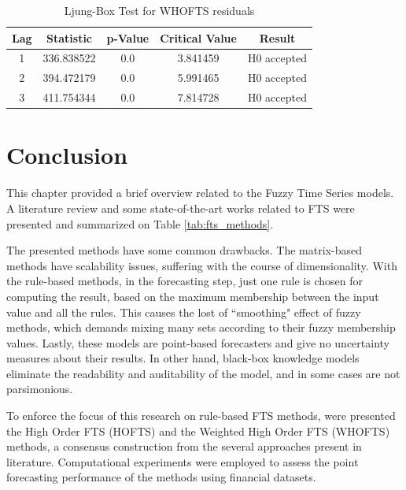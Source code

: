\begin{table}[htb]
    \centering
    \begin{tabular}{|c|c|c|c|c|}
\hline
Lag &   Statistic &  p-Value &  Critical Value &       Result \\ \hline
1 &  336.838522 &      0.0 &        3.841459 &  H0 accepted \\ \hline
2 &  394.472179 &      0.0 &        5.991465 &  H0 accepted \\ \hline
3 &  411.754344 &      0.0 &        7.814728 &  H0 accepted \\ \hline
\end{tabular}
    \caption{Ljung-Box Test for WHOFTS residuals}
    \label{tab:whofts_residuals}
\end{table}

\section{Conclusion} 

This chapter provided a brief overview related to the Fuzzy Time Series models. A literature review and some state-of-the-art works related to FTS were presented and summarized on Table \ref{tab:fts_methods}.

The presented methods have some common drawbacks. The matrix-based methods have scalability issues, suffering with the course of dimensionality. With the rule-based methods, in the forecasting step, just one rule is chosen for computing the result, based on the maximum membership between the input value and all the rules. This causes the lost of ``smoothing" effect of fuzzy methods, which demands mixing many sets according to their fuzzy membership values. Lastly, these models are point-based forecasters and give no uncertainty measures about their results.  In other hand, black-box knowledge models eliminate the readability and auditability of the model, and in some cases are not parsimonious. 

To enforce the focus of this research on rule-based FTS methods, were presented the High Order FTS (HOFTS) and the Weighted High Order FTS (WHOFTS) methods, a consensus construction from the several approaches present in literature. Computational experiments were employed to assess the point forecasting performance of the methods using financial datasets.


